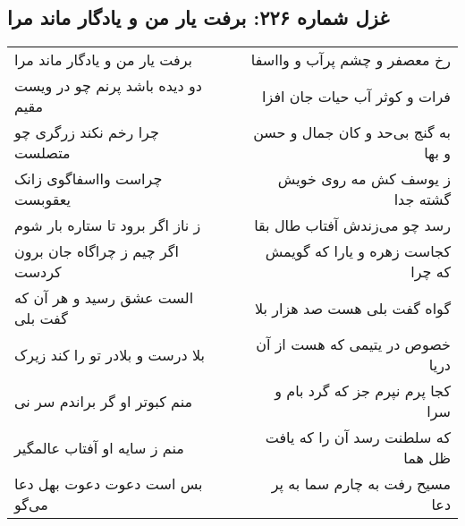 \begin{center}
\section*{غزل شماره ۲۲۶: برفت یار من و یادگار ماند مرا}
\label{sec:0226}
\begin{longtable}{l p{0.5cm} r}
برفت یار من و یادگار ماند مرا
&&
رخ معصفر و چشم پرآب و وااسفا
\\
دو دیده باشد پرنم چو در ویست مقیم
&&
فرات و کوثر آب حیات جان افزا
\\
چرا رخم نکند زرگری چو متصلست
&&
به گنج بی‌حد و کان جمال و حسن و بها
\\
چراست وااسفاگوی زانک یعقوبست
&&
ز یوسف کش مه روی خویش گشته جدا
\\
ز ناز اگر برود تا ستاره بار شوم
&&
رسد چو می‌زندش آفتاب طال بقا
\\
اگر چیم ز چراگاه جان برون کردست
&&
کجاست زهره و یارا که گویمش که چرا
\\
الست عشق رسید و هر آن که گفت بلی
&&
گواه گفت بلی هست صد هزار بلا
\\
بلا درست و بلادر تو را کند زیرک
&&
خصوص در یتیمی که هست از آن دریا
\\
منم کبوتر او گر براندم سر نی
&&
کجا پرم نپرم جز که گرد بام و سرا
\\
منم ز سایه او آفتاب عالمگیر
&&
که سلطنت رسد آن را که یافت ظل هما
\\
بس است دعوت دعوت بهل دعا می‌گو
&&
مسیح رفت به چارم سما به پر دعا
\\
\end{longtable}
\end{center}
